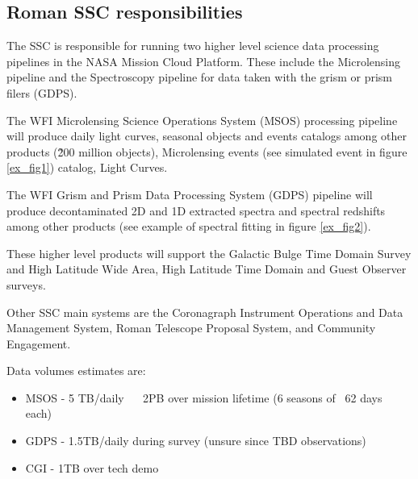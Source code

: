 \documentclass[11pt,twoside]{article}
\begin{document}
\subsection{Roman SSC responsibilities}

The SSC is responsible for running two higher level science data processing pipelines
in the NASA Mission Cloud Platform. These include the Microlensing pipeline and the
Spectroscopy pipeline for data taken with the grism or prism filers (GDPS).

The WFI Microlensing Science Operations System (MSOS) processing pipeline will produce daily light curves, seasonal objects and events catalogs among other products (\~200 million objects), Microlensing events (see simulated event in figure \ref{ex_fig1}) catalog, Light Curves.

The WFI Grism and Prism Data Processing System (GDPS) pipeline will produce decontaminated 2D and 1D extracted spectra and spectral redshifts among other products (see example of spectral fitting in figure \ref{ex_fig2}). 

These higher level products will support the Galactic Bulge Time Domain Survey and High Latitude Wide Area, High Latitude Time Domain and Guest Observer surveys.

Other SSC main systems are the Coronagraph Instrument Operations and Data Management System, Roman Telescope Proposal System, and Community Engagement.

Data volumes estimates are:

\begin{itemize}
\item MSOS - 5 TB/daily  ~ 2PB over mission lifetime (6 seasons of ~62 days each) 
\item GDPS - 1.5TB/daily during survey (unsure since TBD observations)
\item CGI - 1TB over tech demo
\end{itemize}


\end{document}
